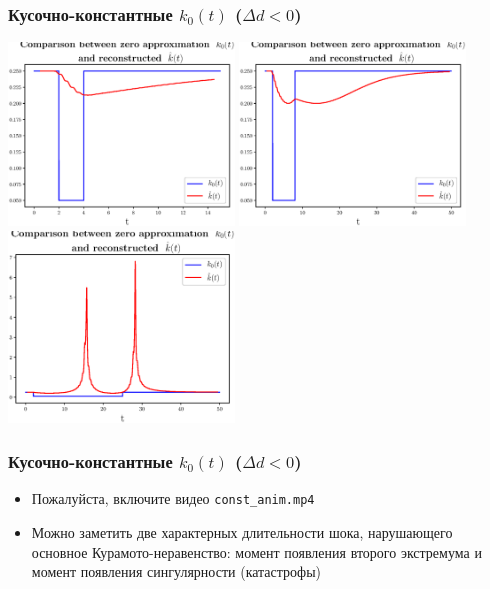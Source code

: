 \documentclass{beamer}
\begin{document}
\begin{frame}
\frametitle{Кусочно-константные $k_0(t)$ ($\Delta d <0$)}
\phantom{123}   
\begin{center}
	\includegraphics[width=0.45\textwidth]{2306_khat_neg_800_15.eps} %
	\includegraphics[width=0.45\textwidth]{2306_khat_neg_2400_50.eps}
	\vfill
	\includegraphics[width=0.45\textwidth]{2306_khat_neg_9200_50.eps}
\end{center}
\end{frame}

\begin{frame}
\frametitle{Кусочно-константные $k_0(t)$ ($\Delta d <0$)}
\begin{itemize}
	\item Пожалуйста, включите видео \texttt{const\_anim.mp4}
	\item Можно заметить две характерных длительности шока, нарушающего основное Курамото-неравенство: момент появления второго экстремума и момент появления сингулярности (катастрофы)
\end{itemize}
\end{frame}
\end{document}
